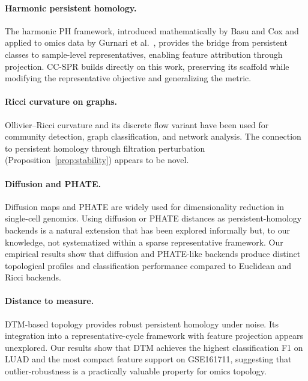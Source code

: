 \documentclass[11pt]{article}
\begin{document}
\paragraph{Harmonic persistent homology.}
The harmonic PH framework, introduced mathematically by Basu and Cox \cite{basuCoxHPH2024} and applied to omics data by Gurnari et al.\ \cite{gurnariHPH2025}, provides the bridge from persistent classes to sample-level representatives, enabling feature attribution through projection.
CC-SPR builds directly on this work, preserving its scaffold while modifying the representative objective and generalizing the metric.

\paragraph{Ricci curvature on graphs.}
Ollivier--Ricci curvature \cite{ollivier2007, ollivier2009} and its discrete flow variant \cite{ni2019community} have been used for community detection, graph classification, and network analysis.
The connection to persistent homology through filtration perturbation (Proposition~\ref{prop:stability}) appears to be novel.

\paragraph{Diffusion and PHATE.}
Diffusion maps \cite{coifman2006diffusion} and PHATE \cite{moon2019phate} are widely used for dimensionality reduction in single-cell genomics.
Using diffusion or PHATE distances as persistent-homology backends is a natural extension that has been explored informally but, to our knowledge, not systematized within a sparse representative framework.
Our empirical results show that diffusion and PHATE-like backends produce distinct topological profiles and classification performance compared to Euclidean and Ricci backends.

\paragraph{Distance to measure.}
DTM-based topology \cite{chazal2011dtm, chazal2017robust} provides robust persistent homology under noise.
Its integration into a representative-cycle framework with feature projection appears unexplored.
Our results show that DTM achieves the highest classification F1 on LUAD and the most compact feature support on GSE161711, suggesting that outlier-robustness is a practically valuable property for omics topology.
\end{document}
